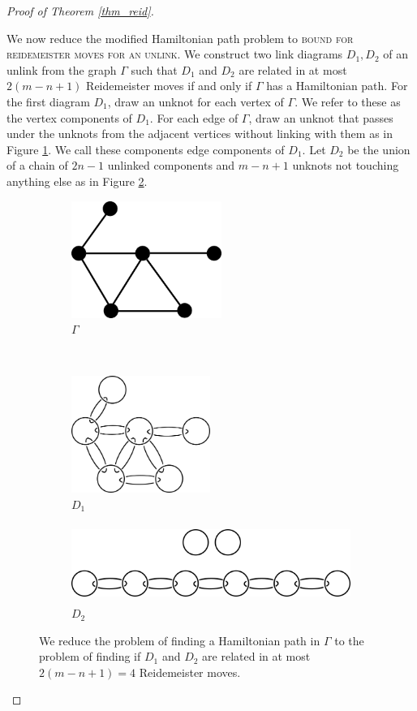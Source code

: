 \documentclass[12pt]{amsart}
\theoremstyle{definition}
\theoremstyle{remark}
\begin{document}
\begin{proof}[Proof of Theorem \ref{thm_reid}]
\begin{figure}[ht]
\end{figure}

We now reduce the modified Hamiltonian path problem to \textsc{bound for reidemeister moves for an unlink}.  We construct two link diagrams $D_1, D_2$ of an unlink from the graph $\Gamma$ such that $D_1$ and $D_2$ are related in at most $2(m-n+1)$ Reidemeister moves if and only if $\Gamma$ has a Hamiltonian path.  For the first diagram $D_1$, draw an unknot for each vertex of $\Gamma$. We refer to these as the vertex components of $D_1$. For each edge of $\Gamma$, draw an unknot that passes under the unknots from the adjacent vertices without linking with them as in Figure \ref{fig_reidboundb}.  We call these components edge components of $D_1$. Let $D_2$ be the union of a chain of $2n-1$ unlinked components and $m-n+1$ unknots not touching anything else as in Figure \ref{fig_reidboundc}.

\begin{figure}[ht]
\centering
    \begin{subfigure}[b]{0.4\textwidth}
        \centering
        \includegraphics[height=1.5in]{reidbound_graph.png}
        \caption{$\Gamma$}
    \end{subfigure}%
    ~
    \begin{subfigure}[b]{0.4\textwidth}
        \centering
        \includegraphics[height=1.5in]{reidbound_link1.png}
        \caption{$D_1$}
        \label{fig_reidboundb}
    \end{subfigure}


        \begin{subfigure}[b]{0.8\textwidth}
        \centering
        \includegraphics[height=1in]{reidbound_link2.png}
        \caption{$D_2$}
        \label{fig_reidboundc}
    \end{subfigure}
\caption{We reduce the problem of finding a Hamiltonian path in $\Gamma$ to the problem of finding if $D_1$ and $D_2$ are related in at most $2(m-n+1)=4$ Reidemeister moves.}
\label{fig_reidbound}
\end{figure}


\end{proof}
\end{document}
